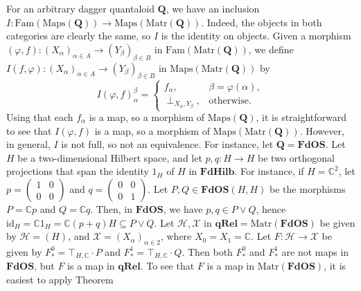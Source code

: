 \documentclass[12pt]{tac}
\theoremstyle{definition}
\theoremstyle{remark}
\renewcommand{\H}{\mathcal H}
\newcommand{\X}{\mathcal X}
\newcommand{\CC}{\mathbb C}
\newcommand{\<}{\langle}
\renewcommand{\>}{\rangle}
\renewcommand{\:}{\colon}
\newcommand{\id}{\mathrm{id}}
\newcommand{\qRel}{\mathbf{qRel}}
\begin{document}
For an arbitrary dagger quantaloid $\mathbf Q$, we  have an inclusion $I:\mathrm{Fam}(\mathrm{Maps}(\mathbf Q))\to\mathrm{Maps}(\mathrm{Matr}(\mathbf Q))$. Indeed, the objects in both categories are clearly the same, so $I$ is the identity on objects. Given a morphism $(\varphi,f):(X_\alpha)_{\alpha\in A}\to(Y_\beta)_{\beta\in B}$ in $\mathrm{Fam}(\mathrm{Matr}(\mathbf Q))$, we define $I(f,\varphi):(X_\alpha)_{\alpha\in A}\to (Y_\beta)_{\beta\in B}$ in $\mathrm{Maps}(\mathrm{Matr}(\mathbf Q))$ by
\[ I(\varphi,f)_\alpha^\beta=\begin{cases}
f_{\alpha}, & \beta=\varphi(\alpha),\\
\perp_{X_\alpha,Y_\beta}, & \text{otherwise}.
\end{cases}
\]
Using that each $f_\alpha$ is a map, so a morphism of $\mathrm{Maps}(\mathbf Q)$, it
is straightforward to see that $I(\varphi,f)$ is a map, so a morphism of
$\mathrm{Maps}(\mathrm{Matr}(\mathbf Q))$. However, in general, $I$ is not full, so not an equivalence. For instance, let $\mathbf Q=\mathbf{FdOS}$. Let $H$ be a two-dimensional Hilbert space, and let $p,q:H\to H$
be two orthogonal projections that span the identity $1_H$ of $H$ in $\mathbf{FdHilb}$. For instance, if $H=\CC^2$, let $p=\begin{pmatrix}
    1 & 0\\
    0 & 0
\end{pmatrix}$ and $q=\begin{pmatrix}
    0 & 0\\
    0 & 1
\end{pmatrix}$. Let $P,Q\in\mathbf{FdOS}(H,H)$ be the morphisms $P=\CC p$ and $Q=\CC q$. Then, in $\mathbf{FdOS}$, we have $p,q\in P\vee Q$, hence $\id_H=\CC 1_H=\CC(p+q)H\subseteq P\vee Q$. Let $\H,\X$ in $\qRel=\mathrm{Matr}(\mathbf{FdOS})$ be given by $\H=(H)$, and $\X=(X_\alpha)_{\alpha\in 2}$, where $X_0=X_1=\CC$. Let $F:\H\to\X$ be given by $F_*^0=\top_{H,\CC}\cdot P$ and $F_*^1=\top_{H,\CC}\cdot Q$.
Then both $F_*^0$ and $F_*^1$ are  not maps in $\mathbf{FdOS}$, but $F$ is a map in $\mathbf{qRel}$. To see that $F$ is a map in $\mathrm{Matr}(\mathbf{FdOS})$, it is easiest to apply Theorem
\end{document}
